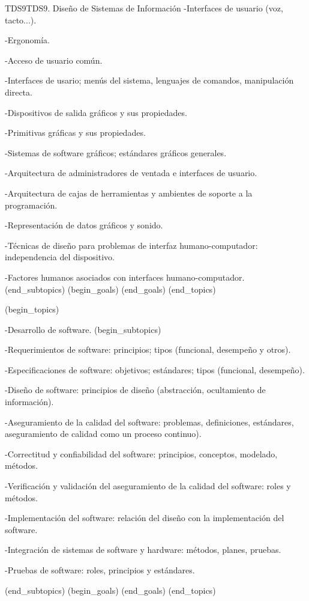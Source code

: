\begin{BKL2}{TDS9}{TDS9. Diseño de Sistemas de Información}
-Interfaces de usuario (voz, tacto...).

-Ergonomía.

-Acceso de usuario común.

-Interfaces de usario; menús del sistema, lenguajes de comandos, manipulación directa.

-Dispositivos de salida gráficos y sus propiedades.

-Primitivas gráficas y sus propiedades.

-Sistemas de software gráficos; estándares gráficos generales.

-Arquitectura de administradores de ventada e interfaces de usuario.

-Arquitectura de cajas de herramientas y ambientes de soporte a la programación.

-Representación de datos gráficos y sonido.

-Técnicas de diseño para problemas de interfaz humano-computador: independencia del dispositivo.

-Factores humanos asociados con interfaces humano-computador.
(end_subtopics)
(begin_goals)
(end_goals)
(end_topics)

 

(begin_topics)

-Desarrollo de software.
(begin_subtopics)

-Requerimientos de software: principios; tipos (funcional, desempeño y otros).

-Especificaciones de software: objetivos; estándares; tipos (funcional, desempeño).

-Diseño de software: principios de diseño (abstracción, ocultamiento de información).

-Aseguramiento de la calidad del software: problemas, definiciones, estándares, aseguramiento de calidad como un proceso continuo).

-Correctitud y confiabilidad del software: principios, conceptos, modelado, métodos.

-Verificación y validación del aseguramiento de la calidad del software: roles y métodos.

-Implementación del software: relación del diseño con la implementación del software.

-Integración de sistemas de software y hardware: métodos, planes, pruebas.

-Pruebas de software: roles, principios y estándares.

(end_subtopics)
(begin_goals)
(end_goals)
(end_topics)

\end{BKL2}



